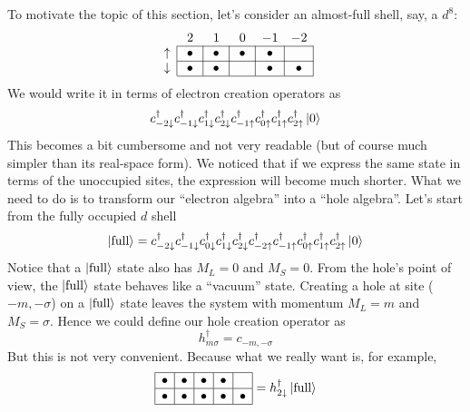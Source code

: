 To motivate the topic of this section, let's
consider an almost-full shell, say, a $d^8$:
\vspace{-0.5em}
\begin{equation*}
\begin{array}{c|c|c|c|c|c|}
\multicolumn{1}{c}{} & \multicolumn{1}{c}{\phantom{,}2\phantom{,}} &
\multicolumn{1}{c}{\phantom{,}1\phantom{,}} & \multicolumn{1}{c}{\phantom{,}0\phantom{,}} &
\multicolumn{1}{c}{-1} & \multicolumn{1}{c}{-2} \\ \cline{2-6}
\uparrow & \bullet & \bullet & \bullet & \bullet &  \\ \cline{2-6}
\downarrow & \bullet & \bullet &  & \bullet & \bullet \\
\cline{2-6}
\end{array}
\end{equation*}
%
We would write it in terms of electron creation operators as
\begin{equation*}
c_{-2\downarrow}^\dagger c_{-1\downarrow}^\dagger c_{1\downarrow}^\dagger c_{2\downarrow}^\dagger
c_{-1\uparrow}^\dagger c_{0\uparrow}^\dagger c_{1\uparrow}^\dagger c_{2\uparrow}^\dagger
\Ket{0}
\end{equation*}
%
This becomes a bit cumbersome and not very readable (but of course
much simpler than its real-space form). We noticed that if we express
the same state in terms of the unoccupied sites, the expression will become
much shorter. What we need to do is to transform our ``electron algebra''
into a ``hole algebra''.
Let's start from the fully occupied $d$ shell
\begin{equation} \label{eq:full}
\Ket{\text{full}} = 
c_{-2\downarrow}^\dagger c_{-1\downarrow}^\dagger c_{0\downarrow}^\dagger c_{1\downarrow}^\dagger c_{2\downarrow}^\dagger
c_{-2\uparrow}^\dagger c_{-1\uparrow}^\dagger c_{0\uparrow}^\dagger c_{1\uparrow}^\dagger c_{2\uparrow}^\dagger
\Ket{0}
\end{equation}
%
Notice that a $\Ket{\text{full}}$ state also has $M_L=0$ and $M_S=0$.
From the hole's point of view, the $\Ket{\text{full}}$ state behaves like a
``vacuum'' state. Creating a hole at site ($-m,-\sigma$) on a $\Ket{\text{full}}$ state
leaves the system with momentum $M_L=m$ and $M_S=\sigma$.
Hence we could define our hole creation operator as
\begin{equation} \label{eq:simpdef}
h_{m\sigma}^\dagger = c_{-m,-\sigma}
\end{equation}
%
But this is not very convenient. Because what we really want is, for example,
\begin{equation} \label{eq:hfull}
\begin{array}{|c|c|c|c|c|}
\hline
\bullet & \bullet & \bullet & \bullet &  \\ \hline
\bullet & \bullet & \bullet & \bullet & \bullet \\
\hline
\end{array}
= h_{2\downarrow}^\dagger \Ket{\text{full}}
\end{equation}

